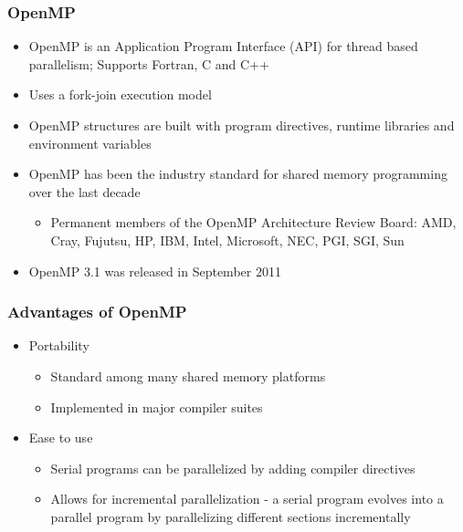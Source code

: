 \documentclass[slidestop,mathserif,compress,xcolor=svgnames]{beamer}
\newenvironment{bblock}[0]
{
\begin{beamerboxesrounded}[upper=uppercol1,lower=lowercol1,shadow=true]}
{\end{beamerboxesrounded}}
\begin{document}
\begin{frame}
  \frametitle{\small OpenMP}
  \begin{bblock}{}
    \begin{itemize}
      \item OpenMP is an Application Program Interface (API) for thread based parallelism; Supports Fortran, C and C++
      \item Uses a fork-join execution model
      \item OpenMP structures are built with program directives, runtime libraries and environment variables
      \item OpenMP has been the industry standard for shared memory programming over the last decade
      \begin{itemize}
        \item Permanent members of the OpenMP Architecture Review Board: AMD, Cray, Fujutsu, HP, IBM, Intel, Microsoft, NEC, PGI, SGI, Sun
      \end{itemize}
      \item OpenMP 3.1 was released in September 2011
    \end{itemize}
  \end{bblock}
\end{frame}

\begin{frame}
  \frametitle{\small Advantages of OpenMP}
  \begin{bblock}{}
    \begin{itemize}
      \item Portability
      \begin{itemize}
        \item Standard among many shared memory platforms
        \item Implemented in major compiler suites
      \end{itemize}
      \item Ease to use 
      \begin{itemize}
        \item Serial programs can be parallelized by adding compiler directives
        \item Allows for incremental parallelization - a serial program evolves into a parallel program by parallelizing different sections incrementally
      \end{itemize}
    \end{itemize}
  \end{bblock}
\end{frame}
\end{document}
